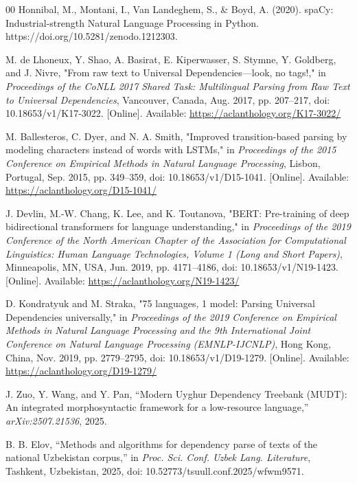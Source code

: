 \documentclass[10pt,conference,a4paper]{IEEEtran_EDM}
\begin{document}
\begin{thebibliography}{00}
 Honnibal, M., Montani, I., Van Landeghem, S., \& Boyd, A. (2020). spaCy: Industrial-strength Natural Language Processing in Python. https://doi.org/10.5281/zenodo.1212303.

M. de Lhoneux, Y. Shao, A. Basirat, E. Kiperwasser, S. Stymne, Y. Goldberg, and J. Nivre, "From raw text to Universal Dependencies---look, no tags!," in \textit{Proceedings of the CoNLL 2017 Shared Task: Multilingual Parsing from Raw Text to Universal Dependencies}, Vancouver, Canada, Aug. 2017, pp. 207--217, doi: 10.18653/v1/K17-3022. [Online]. Available: \url{https://aclanthology.org/K17-3022/}

M. Ballesteros, C. Dyer, and N. A. Smith, "Improved transition-based parsing by modeling characters instead of words with LSTMs," in \textit{Proceedings of the 2015 Conference on Empirical Methods in Natural Language Processing}, Lisbon, Portugal, Sep. 2015, pp. 349--359, doi: 10.18653/v1/D15-1041. [Online]. Available: \url{https://aclanthology.org/D15-1041/}

J. Devlin, M.-W. Chang, K. Lee, and K. Toutanova, "BERT: Pre-training of deep bidirectional transformers for language understanding," in \textit{Proceedings of the 2019 Conference of the North American Chapter of the Association for Computational Linguistics: Human Language Technologies, Volume 1 (Long and Short Papers)}, Minneapolis, MN, USA, Jun. 2019, pp. 4171--4186, doi: 10.18653/v1/N19-1423. [Online]. Available: \url{https://aclanthology.org/N19-1423/}

D. Kondratyuk and M. Straka, "75 languages, 1 model: Parsing Universal Dependencies universally," in \textit{Proceedings of the 2019 Conference on Empirical Methods in Natural Language Processing and the 9th International Joint Conference on Natural Language Processing (EMNLP-IJCNLP)}, Hong Kong, China, Nov. 2019, pp. 2779--2795, doi: 10.18653/v1/D19-1279. [Online]. Available: \url{https://aclanthology.org/D19-1279/}

 J. Zuo, Y. Wang, and Y. Pan, ``Modern Uyghur Dependency Treebank (MUDT): An integrated morphosyntactic framework for a low-resource language,'' \textit{arXiv:2507.21536}, 2025.

 B. B. Elov, ``Methods and algorithms for dependency parse of texts of the national Uzbekistan corpus,'' in \textit{Proc. Sci. Conf. Uzbek Lang. Literature}, Tashkent, Uzbekistan, 2025, doi: 10.52773/tsuull.conf.2025/wfwm9571.


\end{thebibliography}
\end{document}
